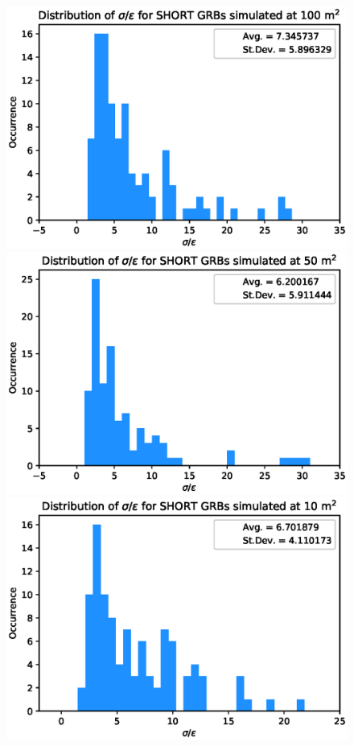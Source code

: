 \documentclass[]{spie}  %
\begin{document}
\begin{figure}[h!]
\centering
\includegraphics[scale=0.5,angle=0]{fig/SHORT/ratio_distrib_100.eps}
\includegraphics[scale=0.5,angle=0]{fig/SHORT/ratio_distrib_50.eps}\\
\includegraphics[scale=0.5,angle=0]{fig/SHORT/ratio_distrib_10.eps}

\end{figure}
\end{document}
